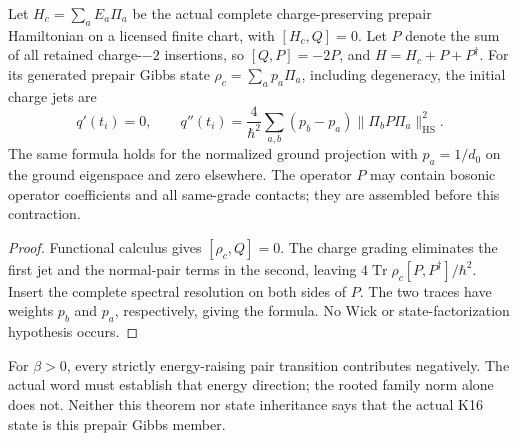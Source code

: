 \documentclass[12pt,a4paper]{article}
\begin{document}
\begin{theorem}
\label{p5c:v2188:thm:spectralpairjet}
Let \(H_c=\sum_a E_a\Pi_a\) be the actual complete charge-preserving
prepair Hamiltonian on a licensed finite chart, with \([H_c,Q]=0\).
Let \(P\) denote the sum of all retained charge-\(-2\) insertions, so
\([Q,P]=-2P\), and \(H=H_c+P+P^\dagger\). For its generated prepair
Gibbs state \(\rho_c=\sum_a p_a\Pi_a\), including degeneracy, the initial
charge jets are
\begin{equation}
 q'(t_i)=0,\qquad
 q''(t_i)=\frac4{\hbar^2}\sum_{a,b}(p_b-p_a)
              \|\Pi_bP\Pi_a\|_{\mathrm{HS}}^2 .
 \label{p5c:v2188:eq:spectralpairjet}
\end{equation}
The same formula holds for the normalized ground projection with
\(p_a=1/d_0\) on the ground eigenspace and zero elsewhere. The operator
\(P\) may contain bosonic operator coefficients and all same-grade
contacts; they are assembled before this contraction.
\end{theorem}
\begin{proof}
Functional calculus gives \([\rho_c,Q]=0\). The charge grading eliminates
the first jet and the normal-pair terms in the second, leaving
\(4\operatorname{Tr}\rho_c[P,P^\dagger]/\hbar^2\).
Insert the complete spectral resolution on both sides of \(P\). The two
traces have weights \(p_b\) and \(p_a\), respectively, giving the formula.
No Wick or state-factorization hypothesis occurs.
\end{proof}
For \(\beta>0\), every strictly energy-raising pair transition contributes
negatively. The actual word must establish that energy direction; the
rooted family norm alone does not. Neither this theorem nor state
inheritance says that the actual K16 state is this prepair Gibbs member.
\end{document}
